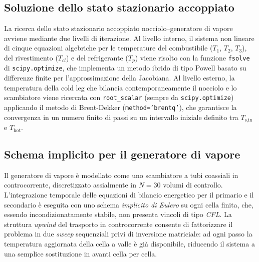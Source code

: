\documentclass[12pt]{report}
\begin{document}
\subsection{Soluzione dello stato stazionario accoppiato}

La ricerca dello stato stazionario accoppiato nocciolo--generatore di vapore avviene mediante due livelli di iterazione. Al livello interno, il sistema non lineare di cinque equazioni algebriche per le temperature del combustibile ($T_1$, $T_2$, $T_3$), del rivestimento ($T_{cl}$) e del refrigerante ($T_p$)
viene risolto con la funzione \texttt{fsolve} di \texttt{scipy.optimize}, che implementa un metodo ibrido di tipo Powell basato su differenze finite per
l'approssimazione della Jacobiana. Al livello esterno, la temperatura della cold leg che bilancia contemporaneamente il nocciolo e lo scambiatore viene ricercata con \texttt{root\_scalar} (sempre da \texttt{scipy.optimize}) applicando il metodo di Brent-Dekker (\texttt{method='brentq'}), che garantisce la convergenza in un numero finito di passi su un intervallo iniziale definito tra $T_{\text{s,in}}$ e $T_\text{hot}$.

\subsection{Schema implicito per il generatore di vapore}

Il generatore di vapore è modellato come uno scambiatore a tubi coassiali in controcorrente, discretizzato assialmente in $N = 30$ volumi di controllo. L'integrazione temporale delle equazioni di bilancio energetico per il primario e il secondario è eseguita con uno schema \emph{implicito di Eulero} su ogni cella finita, che, essendo incondizionatamente stabile, non presenta vincoli di tipo \textit{CFL}. La struttura \textit{upwind} del trasporto in controcorrente consente di fattorizzare il problema in due \textit{sweep} sequenziali privi di inversione matriciale: ad ogni passo la temperatura aggiornata della cella a valle è già disponibile, riducendo il sistema a una semplice sostituzione in avanti cella per cella.
\end{document}
